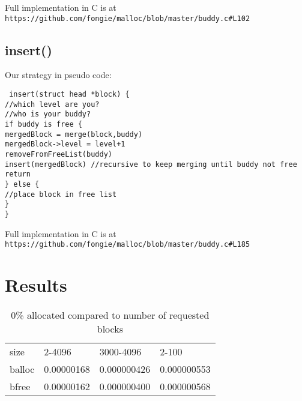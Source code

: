 \documentclass{article}
\def\code#1{\texttt{#1}}
\begin{document}
Full implementation in C is at \code{https://github.com/fongie/malloc/blob/master/buddy.c\#L102}

\subsection{insert()}
Our strategy in pseudo code:

\noindent \code{
	insert(struct head *block) \{ \\
\hspace*{2em}	//which level are you? \\
\hspace*{2em}	//who is your buddy? \\
\hspace*{2em}	if buddy is free \{ \\
\hspace*{4em}		mergedBlock = merge(block,buddy) \\
\hspace*{4em}		mergedBlock->level = level+1 \\
\hspace*{4em}		removeFromFreeList(buddy) \\
\hspace*{4em}		insert(mergedBlock) //recursive to keep merging until buddy not free \\
\hspace*{4em}		return \\
\hspace*{2em}	\} else \{ \\
\hspace*{4em}		//place block in free list \\
\hspace*{2em}	\} \\
	\}
}

Full implementation in C is at \code{https://github.com/fongie/malloc/blob/master/buddy.c\#L185}
\FloatBarrier
\section{Results}

\begin{table}[]
\caption{0\% allocated compared to number of requested blocks}
\begin{tabular}{llll}
	size         & 2-4096     & 3000-4096   & 2-100         \\
	balloc       & 0.00000168 & 0.000000426 & 0.000000553  \\
	bfree        & 0.00000162 & 0.000000400 & 0.000000568 \\
\end{tabular}
\end{table}
\end{document}
